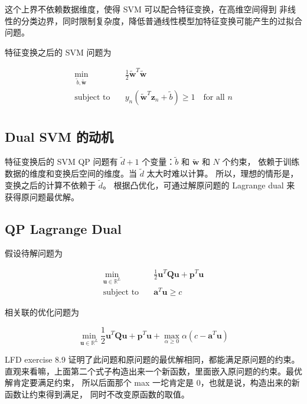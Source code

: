 \documentclass[a4paper]{article}
\begin{document}
这个上界不依赖数据维度，使得 SVM 可以配合特征变换，在高维空间得到
非线性的分类边界，同时限制复杂度，降低普通线性模型加特征变换可能产生的过拟合问题。

特征变换之后的 SVM 问题为

\begin{equation}
\begin{aligned}
\min_{\tilde{b}, \tilde{\mathbf{w}}} \quad& \frac{1}{2}\tilde{\mathbf{w}}^{T}\tilde{\mathbf{w}} \\
\text{subject to} \quad& y_n(\tilde{\mathbf{w}}^{T}\mathbf{z}_n + \tilde{b}) \ge 1 \quad \text{for all } n\\
\end{aligned}
\end{equation}


\subsection{Dual SVM 的动机}
特征变换后的 SVM QP 问题有 $\tilde{d}+1$ 个变量：$\tilde{b}$ 和 $\tilde{\mathbf{w}}$ 和 $N$ 个约束，
依赖于训练数据的维度和变换后空间的维度。当 $\tilde{d}$ 太大时难以计算。
所以，理想的情形是，变换之后的计算不依赖于 $\tilde{d}$。
根据凸优化，可通过解原问题的 Lagrange dual 来获得原问题最优解。

\subsection{QP Lagrange Dual}
假设待解问题为

\begin{equation}
\begin{aligned}
\min_{\mathbf{u} \in \mathbb{R}^{L}} \quad& \frac{1}{2}\mathbf{u}^{T}\mathbf{Qu} + \mathbf{p}^{T}\mathbf{u} \\
\text{subject to} \quad& \mathbf{a}^{T}\mathbf{u} \ge c
\end{aligned}
\end{equation}

相关联的优化问题为

\begin{equation}
\min_{\mathbf{u} \in \mathbb{R}^{L}} \frac{1}{2}\mathbf{u}^{T}\mathbf{Qu} + \mathbf{p}^{T}\mathbf{u} + \max_{\alpha \ge 0} \alpha(c - \mathbf{a}^{T}\mathbf{u})
\end{equation}

LFD exercise 8.9 证明了此问题和原问题的最优解相同，都能满足原问题的约束。
直观来看嘛，上面第二个式子构造出来一个新函数，里面嵌入原问题的约束。最优解肯定要满足约束，
所以后面那个 max 一坨肯定是 0，也就是说，构造出来的新函数让约束得到满足，
同时不改变原函数的取值。
\end{document}

